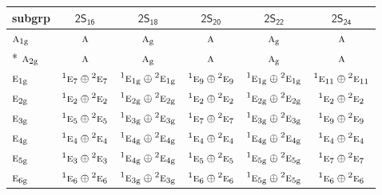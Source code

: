 \documentclass[10pt,a4paper]{article}
\numberwithin{equation}{section}
\newcommand{\grp}[1]{\mathsf{#1}}
\newcommand{\irr}[1]{\text{\normalfont\scshape #1}}
\newcommand{\conjpair}[1]{{}^{#1}}
\newcommand{\ptag}[1]{\mathrm{#1}}
\begin{document}
{\small\begin{longtable}{@{}lccccc@{}}\toprule
subgrp & \href{2S16.pdf}{$\grp{2S_{16}}$} & \href{2S18.pdf}{$\grp{2S_{18}}$} & \href{2S20.pdf}{$\grp{2S_{20}}$} & \href{2S22.pdf}{$\grp{2S_{22}}$} & \href{2S24.pdf}{$\grp{2S_{24}}$}\\\midrule\endhead
\bottomrule\endfoot\endlastfoot
$\irr{a}_{1\ptag{g}}$ & $\irr{a}$ & $\irr{a}_{\ptag{g}}$ & $\irr{a}$ & $\irr{a}_{\ptag{g}}$ & $\irr{a}$\\*
$\irr{a}_{2\ptag{g}}$ & $\irr{a}$ & $\irr{a}_{\ptag{g}}$ & $\irr{a}$ & $\irr{a}_{\ptag{g}}$ & $\irr{a}$\\
$\irr{e}_{1\ptag{g}}$ & $\conjpair{1}\irr{e}_{7}\oplus \conjpair{2}\irr{e}_{7}$ & $\conjpair{1}\irr{e}_{1\ptag{g}}\oplus \conjpair{2}\irr{e}_{1\ptag{g}}$ & $\conjpair{1}\irr{e}_{9}\oplus \conjpair{2}\irr{e}_{9}$ & $\conjpair{1}\irr{e}_{1\ptag{g}}\oplus \conjpair{2}\irr{e}_{1\ptag{g}}$ & $\conjpair{1}\irr{e}_{11}\oplus \conjpair{2}\irr{e}_{11}$\\
$\irr{e}_{2\ptag{g}}$ & $\conjpair{1}\irr{e}_{2}\oplus \conjpair{2}\irr{e}_{2}$ & $\conjpair{1}\irr{e}_{2\ptag{g}}\oplus \conjpair{2}\irr{e}_{2\ptag{g}}$ & $\conjpair{1}\irr{e}_{2}\oplus \conjpair{2}\irr{e}_{2}$ & $\conjpair{1}\irr{e}_{2\ptag{g}}\oplus \conjpair{2}\irr{e}_{2\ptag{g}}$ & $\conjpair{1}\irr{e}_{2}\oplus \conjpair{2}\irr{e}_{2}$\\
$\irr{e}_{3\ptag{g}}$ & $\conjpair{1}\irr{e}_{5}\oplus \conjpair{2}\irr{e}_{5}$ & $\conjpair{1}\irr{e}_{3\ptag{g}}\oplus \conjpair{2}\irr{e}_{3\ptag{g}}$ & $\conjpair{1}\irr{e}_{7}\oplus \conjpair{2}\irr{e}_{7}$ & $\conjpair{1}\irr{e}_{3\ptag{g}}\oplus \conjpair{2}\irr{e}_{3\ptag{g}}$ & $\conjpair{1}\irr{e}_{9}\oplus \conjpair{2}\irr{e}_{9}$\\
$\irr{e}_{4\ptag{g}}$ & $\conjpair{1}\irr{e}_{4}\oplus \conjpair{2}\irr{e}_{4}$ & $\conjpair{1}\irr{e}_{4\ptag{g}}\oplus \conjpair{2}\irr{e}_{4\ptag{g}}$ & $\conjpair{1}\irr{e}_{4}\oplus \conjpair{2}\irr{e}_{4}$ & $\conjpair{1}\irr{e}_{4\ptag{g}}\oplus \conjpair{2}\irr{e}_{4\ptag{g}}$ & $\conjpair{1}\irr{e}_{4}\oplus \conjpair{2}\irr{e}_{4}$\\
$\irr{e}_{5\ptag{g}}$ & $\conjpair{1}\irr{e}_{3}\oplus \conjpair{2}\irr{e}_{3}$ & $\conjpair{1}\irr{e}_{4\ptag{g}}\oplus \conjpair{2}\irr{e}_{4\ptag{g}}$ & $\conjpair{1}\irr{e}_{5}\oplus \conjpair{2}\irr{e}_{5}$ & $\conjpair{1}\irr{e}_{5\ptag{g}}\oplus \conjpair{2}\irr{e}_{5\ptag{g}}$ & $\conjpair{1}\irr{e}_{7}\oplus \conjpair{2}\irr{e}_{7}$\\
$\irr{e}_{6\ptag{g}}$ & $\conjpair{1}\irr{e}_{6}\oplus \conjpair{2}\irr{e}_{6}$ & $\conjpair{1}\irr{e}_{3\ptag{g}}\oplus \conjpair{2}\irr{e}_{3\ptag{g}}$ & $\conjpair{1}\irr{e}_{6}\oplus \conjpair{2}\irr{e}_{6}$ & $\conjpair{1}\irr{e}_{5\ptag{g}}\oplus \conjpair{2}\irr{e}_{5\ptag{g}}$ & $\conjpair{1}\irr{e}_{6}\oplus \conjpair{2}\irr{e}_{6}$\\

\end{longtable}}
\end{document}
